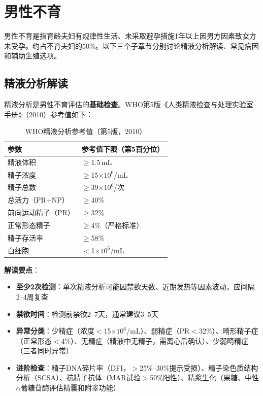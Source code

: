 \section{男性不育}

男性不育是指育龄夫妇有规律性生活、未采取避孕措施1年以上因男方因素致女方未受孕。约占不育夫妇的50\%。以下三个子章节分别讨论精液分析解读、常见病因和辅助生殖选项。

\subsection{精液分析解读}

精液分析是男性不育评估的\textbf{基础检查}。WHO第5版《人类精液检查与处理实验室手册》（2010）参考值如下：

\begin{table}[htbp]
\centering
\caption{WHO精液分析参考值（第5版，2010）}
\label{tab:semen_analysis_who}
\begin{tabularx}{\textwidth}{@{}lX@{}}
    \toprule
    \textbf{参数} & \textbf{参考值下限（第5百分位）} \\
    \midrule
    精液体积 & $\ge$1.5\,mL \\
    精子浓度 & $\ge$15$\times10^6$/mL \\
    精子总数 & $\ge$39$\times10^6$/次 \\
    总活力（PR+NP） & $\ge$40\% \\
    前向运动精子（PR） & $\ge$32\% \\
    正常形态精子 & $\ge$4\%（严格标准） \\
    精子存活率 & $\ge$58\% \\
    白细胞 & $<$1$\times10^6$/mL \\
    \bottomrule
\end{tabularx}
\end{table}

\textbf{解读要点}：
\begin{itemize}[leftmargin=2cm]
	\item \textbf{至少2次检测}：单次精液分析可能因禁欲天数、近期发热等因素波动，应间隔2--4周复查
	\item \textbf{禁欲时间}：检测前禁欲2--7天，通常建议3--5天
	\item \textbf{异常分类}：少精症（浓度$<$15$\times10^6$/mL）、弱精症（PR$<$32\%）、畸形精子症（正常形态$<$4\%）、无精症（精液中无精子，需离心后确认）、少弱畸精症（三者同时异常）
	\item \textbf{进阶检查}：精子DNA碎片率（DFI，$>$25\%--30\%提示受损）、精子染色质结构分析（SCSA）、抗精子抗体（MAR试验$>$50\%阳性）、精浆生化（果糖、中性$\alpha$葡糖苷酶评估精囊和附睾功能）
\end{itemize}

